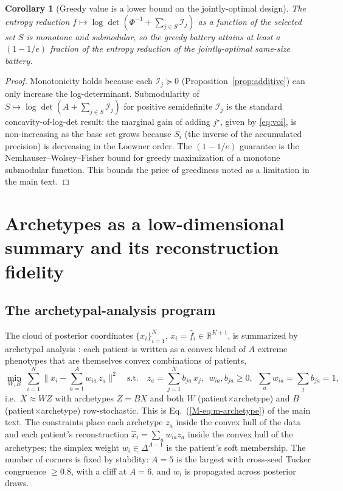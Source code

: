 \documentclass[11pt]{article}
\newcommand{\info}{\mathcal{I}}
\theoremstyle{plain}
\newtheorem{corollary}{Corollary}
\theoremstyle{definition}
\newcommand{\MEq}[1]{Eq.~(\ref{M-#1})}
\begin{document}
\begin{corollary}[Greedy value is a lower bound on the jointly-optimal design]\label{cor:greedy}
The entropy reduction $f\mapsto\log\det(\Phi^{-1}+\sum_{j\in S}\info_j)$ as a function of the
selected set $S$ is monotone and submodular, so the greedy battery attains at least a
$(1-1/e)$ fraction of the entropy reduction of the jointly-optimal same-size battery.
\end{corollary}
\begin{proof}
Monotonicity holds because each $\info_j\succeq0$ (Proposition~\ref{prop:additive}) can only
increase the log-determinant. Submodularity of $S\mapsto\log\det(A+\sum_{j\in S}\info_j)$ for
positive semidefinite $\info_j$ is the standard concavity-of-log-det result: the marginal gain
of adding $j^\star$, given by \eqref{eq:voi}, is non-increasing as the base set grows because
$S_i$ (the inverse of the accumulated precision) is decreasing in the Loewner order. The
$(1-1/e)$ guarantee is the Nemhauser–Wolsey–Fisher bound for greedy maximization of a
monotone submodular function. This bounds the price of greediness noted as a limitation in
the main text.
\end{proof}

\section{Archetypes as a low-dimensional summary and its reconstruction fidelity}
\label{sec:arch}

\subsection{The archetypal-analysis program}
\label{sub:aa}

The cloud of posterior coordinates $\{x_i\}_{i=1}^N$, $x_i=\hat f_i\in\mathbb R^{K+1}$, is
summarized by archetypal analysis \citep{cutler1994archetypal}: each patient is written as a
convex blend of $A$ extreme phenotypes that are themselves convex combinations of patients,
\begin{equation}
  \min_{W,B}\ \sum_{i=1}^{N}\Big\|x_i-\sum_{a=1}^{A} w_{ia}\,z_a\Big\|^{2}
  \quad\text{s.t.}\quad z_a=\sum_{j=1}^{N} b_{ja}\,x_j,\ \
  w_{ia},b_{ja}\ge0,\ \ \textstyle\sum_a w_{ia}=\sum_j b_{ja}=1 ,
  \label{eq:aa}
\end{equation}
i.e.\ $X\approx WZ$ with archetypes $Z=BX$ and both $W$ (patient$\times$archetype) and $B$
(patient$\times$archetype) row-stochastic. This is \MEq{eq:m-archetype} of the main text. The
constraints place each archetype $z_a$ inside the convex hull of the data and each patient's
reconstruction $\hat x_i=\sum_a w_{ia}z_a$ inside the convex hull of the archetypes; the
simplex weight $w_i\in\Delta^{A-1}$ is the patient's soft membership. The number of corners is
fixed by stability: $A=5$ is the largest with cross-seed Tucker congruence $\ge0.8$, with a
cliff at $A=6$, and $w_i$ is propagated across posterior draws.
\end{document}
